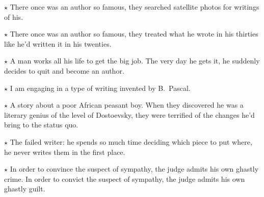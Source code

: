 \documentclass[oneside]{book}
\begin{document}
$\star$ There once was an author so famous, they searched satellite photos for writings of his.




$\star$ There once was an author so famous, they treated what he wrote in his thirties
like he'd written it in his twenties.

$\star$ A man works all his life to get the big job.  The very day he gets it, he suddenly
decides to quit and become an author.

$\star$ I am engaging in a type of writing invented by B.~Pascal.



$\star$ A story about a poor African peasant boy.  When they discovered he was a literary
genius of the level of Dostoevsky, they were terrified of the changes he'd bring to the
status quo.

$\star$ The failed writer: he spends so much time deciding which piece to put where,
he never writes them in the first place.


$\star$ In order to convince the suspect of sympathy, the judge admits his own ghastly
crime.  In order to convict the suspect of sympathy, the judge admits his own ghastly guilt.

\end{document}
